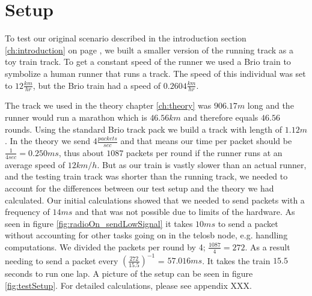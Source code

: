 \section{Setup}\label{sc:setup}

To test our original scenario described in the introduction section \ref{ch:introduction} on page \pageref{ch:introduction}, we built a smaller version of the running track as a toy train track. To get a constant speed of the runner we used a Brio train to symbolize a human runner that runs a track. The speed of this individual was set to $12\frac{km}{hr}$, but the Brio train had a speed of $0.2604\frac{km}{hr}$.

\noindent The track we used in the theory chapter \ref{ch:theory} was $906.17m$ long and the runner would run a marathon which is $46.56km$ and therefore equals $46.56$ rounds. Using the standard Brio track pack we build a track with length of $1.12m$. In the theory we send $4\frac{packets}{sec}$ and that means our time per packet should be $\frac{1}{4sec} = 0.250ms$, thus about $1087$ packets per round if the runner runs at an average speed of $12km/h$. But as our train is vastly slower than an actual runner, and the testing train track was shorter than the running track, we needed to account for the differences between our test setup and the theory we had calculated. Our initial calculations showed that we needed to send packets with a frequency of $14ms$ and that was not possible due to limits of the hardware. As seen in figure \ref{fig:radioOn_sendLowSignal} it takes $10ms$ to send a packet without accounting for other tasks going on in the telosb node, e.g. handling computations. We divided the packets per round by 4; $\frac{1087}{4} = 272$. As a result needing to send a packet every $(\frac{272}{15.5})^{-1}$ = $57.016 ms$. It takes the train $15.5$ seconds to run one lap. A picture of the setup can be seen in figure \ref{fig:testSetup}. For detailed calculations, please see appendix XXX.

